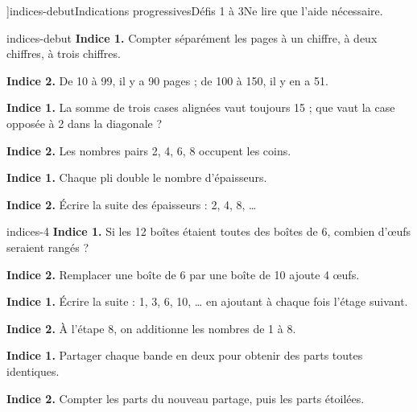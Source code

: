 \editionPage[\pdfbookmark[0]{Indications des défis}{bm-indices-debut-parent}]{indices-debut}{Indications progressives}{Défis 1 à 3}{Ne lire que l’aide nécessaire.}
\begin{blocEdition}{indices-debut}
\textbf{Indice 1.} Compter séparément les pages à un chiffre, à deux chiffres, à trois chiffres.\par\medskip\textbf{Indice 2.} De 10 à 99, il y a 90 pages ; de 100 à 150, il y en a 51.\par
{}\textbf{Indice 1.} La somme de trois cases alignées vaut toujours 15 ; que vaut la case opposée à 2 dans la diagonale ?\par\medskip\textbf{Indice 2.} Les nombres pairs 2, 4, 6, 8 occupent les coins.\par
{}\textbf{Indice 1.} Chaque pli double le nombre d’épaisseurs.\par\medskip\textbf{Indice 2.} Écrire la suite des épaisseurs : 2, 4, 8, …\par

\end{blocEdition}
\begin{blocEdition}{indices-4}
\textbf{Indice 1.} Si les 12 boîtes étaient toutes des boîtes de 6, combien d’œufs seraient rangés ?\par\medskip\textbf{Indice 2.} Remplacer une boîte de 6 par une boîte de 10 ajoute 4 œufs.\par
{}\textbf{Indice 1.} Écrire la suite : 1, 3, 6, 10, … en ajoutant à chaque fois l’étage suivant.\par\medskip\textbf{Indice 2.} À l’étape 8, on additionne les nombres de 1 à 8.\par
{}\textbf{Indice 1.} Partager chaque bande en deux pour obtenir des parts toutes identiques.\par\medskip\textbf{Indice 2.} Compter les parts du nouveau partage, puis les parts étoilées.\par

\end{blocEdition}
